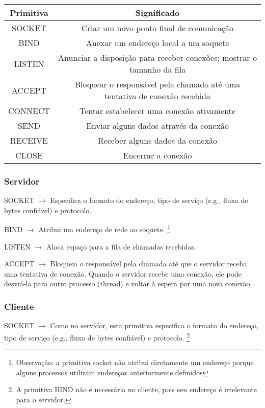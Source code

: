 \begin{tabular}{|c|c|}
    \hline
    Primitiva & Significado \\
    \hline
    SOCKET & Criar um novo ponto final de comunicação \\ 
    BIND & Anexar um endereço local a um soquete \\
    LISTEN & Anunciar a disposição para receber conexões; mostrar o tamanho da fila \\
    ACCEPT & Bloquear o responsável pela chamada até uma tentativa de conexão recebida \\
    CONNECT & Tentar estabelecer uma conexão ativamente \\
    SEND & Enviar alguns dados através da conexão \\
    RECEIVE & Receber alguns dados da conexão \\
    CLOSE & Encerrar a conexão \\
    \hline
\end{tabular}

\subsubsection*{Servidor}

SOCKET $\rightarrow$ Especifica o formato do endereço, tipo de serviço (e.g., fluxo de
bytes confiável) e protocolo.

BIND $\rightarrow$ Atribui um endereço de rede ao soquete. \footnote{Observação: a primitiva 
socket não atribui diretamente um endereço porque alguns processos utilizam endereços
anteriormente definidos}

LISTEN $\rightarrow$ Aloca espaço para a fila de
chamadas recebidas.

ACCEPT $\rightarrow$ Bloqueia o responsável pela chamada até que o servidor
receba uma tentativa de conexão. Quando o servidor recebe uma conexão, ele pode desviá-la para
outro processo (thread) e voltar à espera por uma nova conexão.

\subsubsection*{Cliente}

SOCKET $\rightarrow$ Como no servidor, esta primitiva especifica o formato do endereço,
tipo de serviço (e.g., fluxo de bytes confiável) e protocolo. \footnote{A primitiva BIND não é necessária
no cliente, pois seu endereço é irrelevante para o servidor.}


